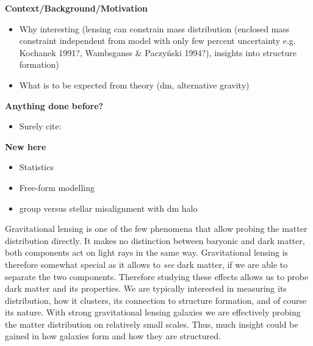 \documentclass[useAMS,usenatbib]{mn2e}
\begin{document}
\textbf{Context/Background/Motivation}
\begin{itemize}
\item Why interesting (lensing can constrain mass distribution (enclosed mass constraint independent from model with only few percent uncertainty e.g. Kochanek 1991?, Wambsganss \& Paczyński 1994?), insights into structure formation)
\item What is to be expected from theory (dm, alternative gravity)
\end{itemize}


\textbf{Anything done before?}
\begin{itemize}
\item Surely cite: \cite{1997ApJ...482..604K,1998ApJ...509..561K,2006ApJ...649..599K,2009ApJ...690..670T,2012ApJ...761..170G}
\end{itemize}


\textbf{New here}
\begin{itemize}
\item Statistics
\item Free-form modelling
\item group versus stellar misalignment with dm halo
\end{itemize}


Gravitational lensing is one of the few phenomena that allow probing the matter distribution directly. It makes no distinction between baryonic and dark matter, both components act on light rays in the same way. Gravitational lensing is therefore somewhat special as it allows to \textit{see} dark matter, if we are able to separate the two components. Therefore studying these effects allows us to probe dark matter and its properties. We are typically interested in measuring its distribution, how it clusters, its connection to structure formation, and of course its nature. With strong gravitational lensing galaxies we are effectively probing the matter distribution on relatively small scales. Thus, much insight could be gained in how galaxies form and how they are structured.
\end{document}
